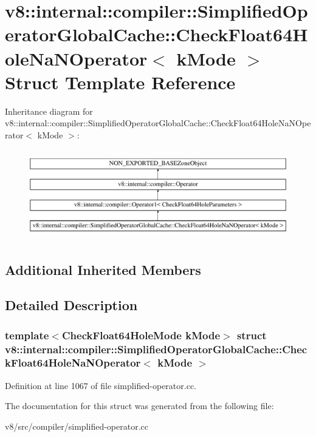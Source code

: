 \hypertarget{structv8_1_1internal_1_1compiler_1_1SimplifiedOperatorGlobalCache_1_1CheckFloat64HoleNaNOperator}{}\section{v8\+:\+:internal\+:\+:compiler\+:\+:Simplified\+Operator\+Global\+Cache\+:\+:Check\+Float64\+Hole\+Na\+N\+Operator$<$ k\+Mode $>$ Struct Template Reference}
\label{structv8_1_1internal_1_1compiler_1_1SimplifiedOperatorGlobalCache_1_1CheckFloat64HoleNaNOperator}
Inheritance diagram for v8\+:\+:internal\+:\+:compiler\+:\+:Simplified\+Operator\+Global\+Cache\+:\+:Check\+Float64\+Hole\+Na\+N\+Operator$<$ k\+Mode $>$\+:\begin{figure}[H]
\begin{center}
\leavevmode
\includegraphics[height=3.943662cm]{structv8_1_1internal_1_1compiler_1_1SimplifiedOperatorGlobalCache_1_1CheckFloat64HoleNaNOperator}
\end{center}
\end{figure}
\subsection*{Additional Inherited Members}


\subsection{Detailed Description}
\subsubsection*{template$<$Check\+Float64\+Hole\+Mode k\+Mode$>$\newline
struct v8\+::internal\+::compiler\+::\+Simplified\+Operator\+Global\+Cache\+::\+Check\+Float64\+Hole\+Na\+N\+Operator$<$ k\+Mode $>$}



Definition at line 1067 of file simplified-\/operator.\+cc.



The documentation for this struct was generated from the following file\+:\begin{DoxyCompactItemize}
\item 
v8/src/compiler/simplified-\/operator.\+cc\end{DoxyCompactItemize}
